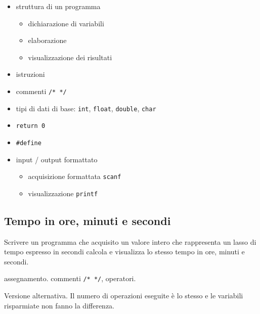 \begin{itemize}
\item struttura di un programma
    \begin{itemize}
    \item dichiarazione di variabili
    \item elaborazione
    \item visualizzazione dei risultati
    \end{itemize}
\item istruzioni
\item commenti \texttt{/* */}
\item tipi di dati di base: \texttt{int}, \texttt{float}, \texttt{double}, \texttt{char}
\item \texttt{return 0}
\item \texttt{\#define}
\item input / output formattato
    \begin{itemize}
    \item acquisizione formattata \texttt{scanf}
    \item visualizzazione \texttt{printf}
    \end{itemize}
\end{itemize}

\mysep{}


\subsection{Tempo in ore, minuti e secondi}
Scrivere un programma che acquisito un valore intero che rappresenta un lasso di tempo espresso in secondi calcola e visualizza lo stesso tempo in ore, minuti e secondi.

\begin{tags}
assegnamento. commenti \texttt{/* */}, operatori.
\end{tags}




Versione alternativa. Il numero di operazioni eseguite \`e lo stesso e le variabili risparmiate non fanno la differenza.


